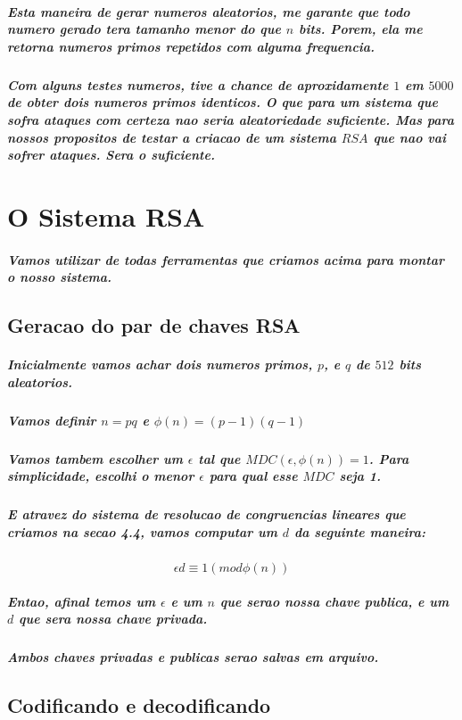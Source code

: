 \documentclass[12pt,twoside, a4paper, twocolumn]{article}
\begin{document}
\subparagraph*{Esta maneira de gerar numeros aleatorios, me garante que todo numero gerado tera tamanho menor do que $n$ bits. Porem, ela me retorna numeros primos repetidos com alguma frequencia.}

\subparagraph*{Com alguns testes numeros, tive a chance de aproxidamente $1$ em $5000$ de obter dois numeros primos identicos. O que para um sistema que sofra ataques com certeza nao seria aleatoriedade suficiente. Mas para nossos propositos de testar a criacao de um sistema $RSA$ que nao vai sofrer ataques. Sera o suficiente.}



\section{O Sistema RSA}

\subparagraph*{Vamos utilizar de todas ferramentas que criamos acima para montar o nosso sistema.}



\subsection{Geracao do par de chaves RSA}

\subparagraph*{Inicialmente vamos achar dois numeros primos, $p$, e $q$ de $512$ bits aleatorios.}

\subparagraph*{Vamos definir $n = pq$ e $\phi(n) = (p-1)(q-1)$}

\subparagraph*{Vamos tambem escolher um $\epsilon$ tal que $MDC(\epsilon, \phi(n)) = 1$. Para simplicidade, escolhi o menor $\epsilon$ para qual esse $MDC$ seja 1.}

\subparagraph*{E atravez do sistema de resolucao de congruencias lineares que criamos na secao 4.4, vamos computar um $d$ da seguinte maneira:}

\begin{equation}
    \epsilon d \equiv 1 (mod \phi(n))
\end{equation}

\subparagraph*{Entao, afinal temos um $\epsilon$ e um $n$ que serao nossa chave publica, e um $d$ que sera nossa chave privada.}

\subparagraph*{Ambos chaves privadas e publicas serao salvas em arquivo.}

\subsection{Codificando e decodificando}
\end{document}

